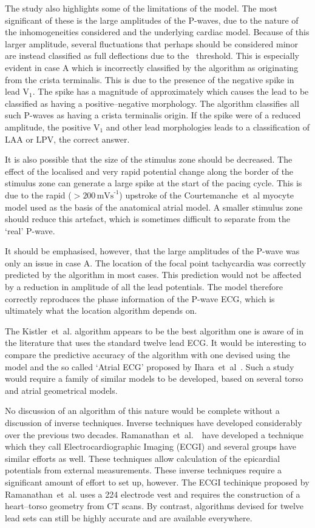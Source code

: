The study also highlights some of the limitations of the model.
The most significant of these is the large amplitudes of the P-waves, due to the
nature of the inhomogeneities considered and the underlying cardiac model.
Because of this larger amplitude, several fluctuations that perhaps should be
considered minor are instead classified as full deflections due to the
\ threshold.
This is especially evident in case A which is incorrectly classified by the
algorithm as originating from the crista terminalis.
This is due to the presence of the negative spike in lead $\text{V}_{\text{1}}$.
The spike has a magnitude of approximately  which causes the lead to be
classified as having a positive--negative morphology.
The algorithm classifies all such P-waves as having a crista terminalis origin.
If the spike were of a reduced amplitude, the positive $\text{V}_{\text{1}}$ and
other lead morphologies leads to a classification of LAA or LPV, the correct
answer.

It is also possible that the size of the stimulus zone should be decreased.
The effect of the localised and very rapid potential change along the border of
the stimulus zone can generate a large spike at the start of the pacing cycle.
This is due to the rapid ($ > 200\,\text{mVs}^{\text{-1}}$) upstroke of the
Courtemanche~et~al myocyte model used as the basis of the anatomical atrial
model.
A smaller stimulus zone should reduce this artefact, which is sometimes
difficult to separate from the `real' P-wave.

It should be emphasised, however, that the large amplitudes of the P-wave was
only an issue in case A.
The location of the focal point tachycardia was correctly predicted by the
algorithm in most cases.
This prediction would not be affected by a reduction in amplitude of all the
lead potentials.
The model therefore correctly reproduces the phase information of the P-wave
ECG, which is ultimately what the location algorithm depends on.

The Kistler~et~al. algorithm appears to be the best algorithm one is aware of in
the literature that uses the standard twelve lead ECG.
It would be interesting to compare the predictive accuracy of the algorithm with
one devised using the model and the so called `Atrial ECG' proposed by
Ihara~et~al~\cite{Ihara2007}.
Such a study would require a family of similar models to be developed, based on
several torso and atrial geometrical models.

No discussion of an algorithm of this nature would be complete without a
discussion of inverse techniques.
Inverse techniques have developed considerably over the previous two decades.
Ramanathan~et~al.~\cite{Ramanathan2006}\ have developed a technique which they
call Electrocardiographic Imaging (ECGI) and several groups have similar efforts
as well.
These techniques allow calculation of the epicardial potentials from external
measurements.
These inverse techniques require a significant amount of effort to set up,
however.
The ECGI techinique proposed by Ramanathan~et~al. uses a 224 electrode vest and
requires the construction of a heart--torso geometry from CT scans.
By contrast, algorithms devised for twelve lead sets can still be highly
accurate and are available everywhere.

